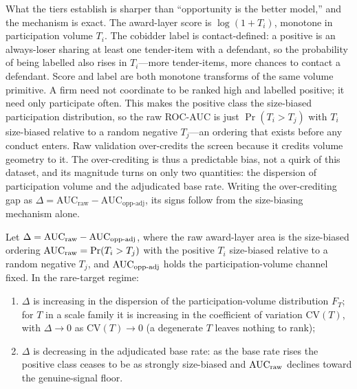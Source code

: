 What the tiers establish is sharper than ``opportunity is the
better model,'' and the mechanism is exact. The award-layer score
is $\log(1+T_i)$, monotone in participation volume $T_i$. The
cobidder label is contact-defined: a positive is an always-loser
sharing at least one tender-item with a defendant, so the
probability of being labelled also rises in $T_i$---more
tender-items, more chances to contact a defendant. Score and label
are both monotone transforms of the same volume primitive. A firm
need not coordinate to be ranked high and labelled positive; it
need only participate often. This makes the positive class the
size-biased participation distribution, so the raw ROC-AUC is just
$\Pr(T_i>T_j)$ with $T_i$ size-biased relative to a random negative
$T_j$---an ordering that exists before any conduct enters. Raw
validation over-credits the screen because it credits volume
geometry to it. The over-crediting is thus a predictable bias, not
a quirk of this dataset, and its magnitude turns on only two
quantities: the dispersion of participation volume and the
adjudicated base rate. Writing the over-crediting gap as
$\Delta = \mathrm{AUC}_{\text{raw}} - \mathrm{AUC}_{\text{opp-adj}}$,
its signs follow from the size-biasing mechanism alone.

\begin{proposition}
\label{prop:inflation}
Let $\Delta = \mathrm{AUC}_{\textnormal{raw}} -
\mathrm{AUC}_{\textnormal{opp-adj}}$, where the raw award-layer area
is the size-biased ordering $\mathrm{AUC}_{\textnormal{raw}} =
\Pr(T_i > T_j)$ with the positive $T_i$ size-biased relative to a
random negative $T_j$, and $\mathrm{AUC}_{\textnormal{opp-adj}}$
holds the participation-volume channel fixed. In the rare-target
regime:
\begin{enumerate}
\item[(a)] $\Delta$ is increasing in the dispersion of the
participation-volume distribution $F_T$; for $T$ in a scale family
it is increasing in the coefficient of variation $\mathrm{CV}(T)$,
with $\Delta \to 0$ as $\mathrm{CV}(T) \to 0$ (a degenerate $T$
leaves nothing to rank);
\item[(b)] $\Delta$ is decreasing in the adjudicated base rate: as
the base rate rises the positive class ceases to be as strongly
size-biased and $\mathrm{AUC}_{\textnormal{raw}}$ declines toward
the genuine-signal floor.
\end{enumerate}
\end{proposition}

